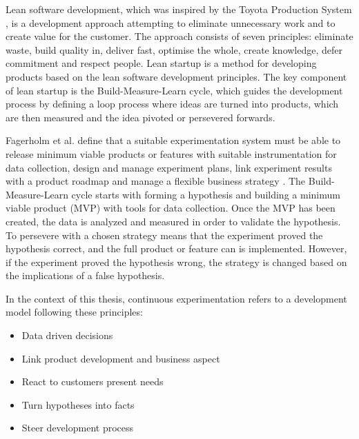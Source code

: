 \documentclass[english]{tktltiki2}
\theoremstyle{definition}
\theoremstyle{remark}
\begin{document}
Lean software development, which was inspired by the Toyota Production System \cite{}, is a development approach attempting to eliminate unnecessary work and to create value for the customer. The approach consists of seven principles: eliminate waste, build quality in, deliver fast, optimise the whole, create knowledge, defer commitment and respect people. Lean startup \cite{ries2011lean} is a method for developing products based on the lean software development principles. The key component of lean startup is the Build-Measure-Learn cycle, which guides the development process by defining a loop process where ideas are turned into products, which are then measured and the idea pivoted or persevered forwards.


Fagerholm et al. define that a suitable experimentation system must be able to release minimum viable products or features with suitable instrumentation for data collection, design and manage experiment plans, link experiment results with a product roadmap and manage a flexible business strategy \cite{fagerholm2014building}. The Build-Measure-Learn cycle starts with forming a hypothesis and building a minimum viable product (MVP) with tools for data collection. Once the MVP has been created, the data is analyzed and measured in order to validate the hypothesis. To persevere with a chosen strategy means that the experiment proved the hypothesis correct, and the full product or feature can is implemented. However, if the experiment proved the hypothesis wrong, the strategy is changed based on the implications of a false hypothesis.

In the context of this thesis, continuous experimentation refers to a development model following these principles: 
\begin{itemize}
\item  Data driven decisions
\item  Link product development and business aspect
\item  React to customers present needs
\item  Turn hypotheses into facts
\item  Steer development process
\end{itemize}
\end{document}
